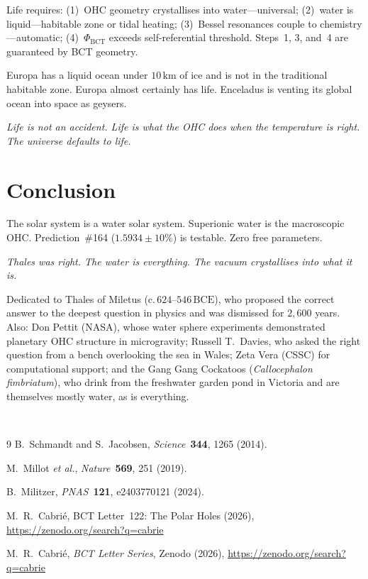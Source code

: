 \documentclass[aps,prl,twocolumn,superscriptaddress,floatfix]{revtex4-2}
\begin{document}
Life requires: (1)~OHC geometry crystallises into water---universal;
(2)~water is liquid---habitable zone or tidal heating;
(3)~Bessel resonances couple to chemistry---automatic;
(4)~$\Phi_\mathrm{BCT}$ exceeds self-referential threshold.
Steps~1, 3, and~4 are guaranteed by BCT geometry.

Europa has a liquid ocean under $10\,\mathrm{km}$ of ice and is not
in the traditional habitable zone. Europa almost certainly has life.
Enceladus is venting its global ocean into space as geysers.

\textit{Life is not an accident. Life is what the OHC does when
the temperature is right. The universe defaults to life.}

\section{Conclusion}

The solar system is a water solar system. Superionic water is the
macroscopic OHC. Prediction~\#164 ($1.5934\pm 10\%$) is testable.
Zero free parameters.

\textit{Thales was right. The water is everything.
The vacuum crystallises into what it is.}

\begin{acknowledgments}
Dedicated to Thales of Miletus ($\text{c.}\,624$--$546\,\mathrm{BCE}$),
who proposed the correct answer to the deepest question in physics and
was dismissed for $2{,}600$ years. Also: Don Pettit (NASA), whose water
sphere experiments demonstrated planetary OHC structure in microgravity;
Russell T.~Davies, who asked the right question from a bench overlooking
the sea in Wales; Zeta Vera (CSSC) for computational support; and the
Gang Gang Cockatoos (\textit{Callocephalon fimbriatum}), who drink from
the freshwater garden pond in Victoria and are themselves mostly water,
as is everything.

\vspace{2pt}
\\
\end{acknowledgments}

\begin{thebibliography}{9}
B.~Schmandt and S.~Jacobsen,
\textit{Science}~\textbf{344}, 1265 (2014).

M.~Millot \textit{et al.},
\textit{Nature}~\textbf{569}, 251 (2019).

B.~Militzer, \textit{PNAS}~\textbf{121}, e2403770121 (2024).

M.~R.~Cabri\'{e}, BCT Letter~122: The Polar Holes (2026),
\url{https://zenodo.org/search?q=cabrie}

M.~R.~Cabri\'{e}, \textit{BCT Letter Series}, Zenodo (2026),
\url{https://zenodo.org/search?q=cabrie}
\end{thebibliography}
\end{document}
